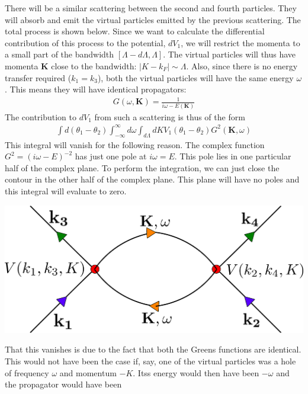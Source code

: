 \documentclass[14pt]{extarticle}
\begin{document}
There will be a similar scattering between the second and fourth particles. They will absorb and emit the virtual particles emitted by the previous scattering. The total process is shown below. Since we want to calculate the differential contribution of this process to the potential, \(dV_1\), we will restrict the momenta to a small part of the bandwidth \(\left[\Lambda - d\Lambda, \Lambda\right]\). The virtual particles will thus have momenta \(\mathbf{K}\) close to the bandwidth: \(|K - k_F|\sim \Lambda\). Also, since there is no energy transfer required (\(k_1=k_3\)), both the virtual particles will have the same energy \(\omega\). This means they will have identical propagators:
\begin{equation}\begin{aligned}
G(\omega,\mathbf{K}) = \frac{1}{i\omega - E(\mathbf{K})}
\end{aligned}\end{equation}
The contribution to \(dV_1\) from such a scattering is thus of the form
\begin{equation}\begin{aligned}
\int d(\theta_1 - \theta_2) \int_{-\infty}^\infty d\omega \int_{d\Lambda}dK V_1(\theta_1 - \theta_2) G^2(\mathbf{K},\omega)
\end{aligned}\end{equation}
This integral will vanish for the following reason. The complex function \(G^2 = \left(i\omega - E\right)^{-2}\) has just one pole at \(i\omega = E\). This pole lies in one particular half of the complex plane. To perform the integration, we can just close the contour in the other half of the complex plane. This plane will have no poles and this integral will evaluate to zero.
\begin{center}
\includegraphics[scale=0.3]{./figures/term3.png}
\end{center}
That this vanishes is due to the fact that both the Greens functions are identical. This would not have been the case if, say, one of the virtual particles was a hole of frequency \(\omega\) and momentum \(-K\). Itss energy would then have been \(-\omega\) and the propagator would have been
\end{document}
